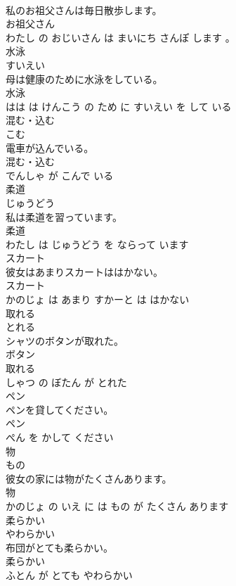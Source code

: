 \documentclass[8pt]{extreport}
\begin{document}
\begin{CJK}{UTF8}{min}
\\	私のお祖父さんは毎日散歩します。	
\\	お祖父さん 
\\	わたし の おじいさん は まいにち さんぽ します 。			
\\	水泳	
\\	すいえい			
\\	母は健康のために水泳をしている。	
\\	水泳 
\\	はは は けんこう の ため に すいえい を して いる			
\\	混む・込む	
\\	こむ			
\\	電車が込んでいる。	
\\	混む・込む 
\\	でんしゃ が こんで いる			
\\	柔道	
\\	じゅうどう			
\\	私は柔道を習っています。	
\\	柔道 
\\	わたし は じゅうどう を ならって います			
\\	スカート	
\\	彼女はあまりスカートははかない。	
\\	スカート 
\\	かのじょ は あまり すかーと は はかない			
\\	取れる	
\\	とれる			
\\	シャツのボタンが取れた。	
\\	ボタン 
\\	取れる 
\\	しゃつ の ぼたん が とれた			
\\	ペン	
\\	ペンを貸してください。	
\\	ペン 
\\	ぺん を かして ください			
\\	物	
\\	もの			
\\	彼女の家には物がたくさんあります。	
\\	物 
\\	かのじょ の いえ に は もの が たくさん あります			
\\	柔らかい	
\\	やわらかい			
\\	布団がとても柔らかい。	
\\	柔らかい 
\\	ふとん が とても やわらかい			

\end{CJK}
\end{document}
